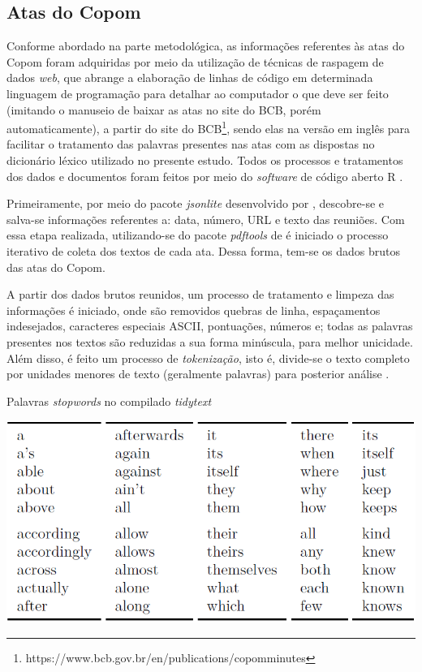 \subsection{Atas do Copom}
 
Conforme abordado na parte metodológica, as informações referentes às atas do Copom foram adquiridas por meio da utilização de técnicas de raspagem de dados \textit{web}, que abrange a elaboração de linhas de código em determinada linguagem de programação para detalhar ao computador o que deve ser feito (imitando o manuseio de baixar as atas no site do BCB, porém automaticamente), a partir do site do BCB\footnote{https://www.bcb.gov.br/en/publications/copomminutes}, sendo elas na versão em inglês para facilitar o tratamento das palavras presentes nas atas com as dispostas no dicionário léxico utilizado no presente estudo. Todos os processos e tratamentos dos dados e documentos foram feitos por meio do \textit{software} de código aberto R \cite{R_Team2020}.
 
Primeiramente, por meio do pacote \textit{jsonlite} desenvolvido por , descobre-se e salva-se informações referentes a: data, número, URL e texto das reuniões. Com essa etapa realizada, utilizando-se do pacote \textit{pdftools} de  é iniciado o processo iterativo de coleta dos textos de cada ata. Dessa forma, tem-se os dados brutos das atas do Copom.
 
A partir dos dados brutos reunidos, um processo de tratamento e limpeza das informações é iniciado, onde são removidos quebras de linha, espaçamentos indesejados, caracteres especiais ASCII, pontuações, números e; todas as palavras presentes nos textos são reduzidas a sua forma minúscula, para melhor unicidade. Além disso, é feito um processo de \textit{tokenização}, isto é, divide-se o texto completo por unidades menores de texto (geralmente palavras) para posterior análise \cite{silge2017text}.

\begin{table}[hbtp]
	\centering
	\caption{Palavras \textit{stopwords} no compilado \textit{tidytext}} \label{table:stopwords}
	\includegraphics[scale = 0.50]{figuras/stopwords.PNG}
\end{table}

